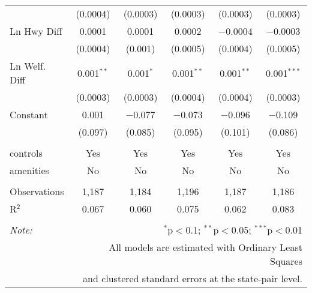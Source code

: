 \begin{table}[!htbp]
\begin{tabular}{@{\extracolsep{5pt}}lccccc}
  & (0.0004) & (0.0003) & (0.0003) & (0.0003) & (0.0003) \\ 
  Ln Hwy Diff & 0.0001 & 0.0001 & 0.0002 & $-$0.0004 & $-$0.0003 \\ 
  & (0.0004) & (0.001) & (0.0005) & (0.0004) & (0.0005) \\ 
  Ln Welf. Diff & 0.001$^{**}$ & 0.001$^{*}$ & 0.001$^{**}$ & 0.001$^{**}$ & 0.001$^{***}$ \\ 
  & (0.0003) & (0.0003) & (0.0004) & (0.0004) & (0.0003) \\ 
  Constant & 0.001 & $-$0.077 & $-$0.073 & $-$0.096 & $-$0.109 \\ 
  & (0.097) & (0.085) & (0.095) & (0.101) & (0.086) \\ 
 \hline \\[-1.8ex] 
controls & Yes & Yes & Yes & Yes & Yes \\ 
amenities & No & No & No & No & No \\ 
\hline \\[-1.8ex] 
Observations & 1,187 & 1,184 & 1,196 & 1,187 & 1,186 \\ 
R$^{2}$ & 0.067 & 0.060 & 0.075 & 0.062 & 0.083 \\ 
\hline 
\hline \\[-1.8ex] 
\textit{Note:}  & \multicolumn{5}{r}{$^{*}$p$<$0.1; $^{**}$p$<$0.05; $^{***}$p$<$0.01} \\ 
 & \multicolumn{5}{r}{All models are estimated with Ordinary Least Squares} \\ 
 & \multicolumn{5}{r}{and clustered standard errors at the state-pair level.} \\ 
\end{tabular} 
\end{table} 
